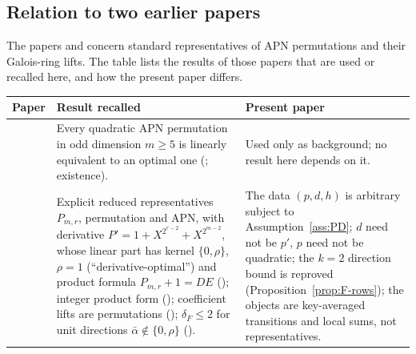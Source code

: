 \subsection{Relation to two earlier papers}
The papers \cite{FukuiIT} and \cite{FukuiFFA} concern standard representatives of APN permutations and their
Galois-ring lifts. The table lists the results of those papers that are used or recalled here, and how the present paper differs.
\begin{center}\small
\begin{tabular}{p{}p{}p{}}
\toprule
Paper & Result recalled & Present paper\\
\midrule
\cite{FukuiIT} & Every quadratic APN permutation in odd dimension $m\ge5$ is linearly equivalent to an optimal
one (\cite[Main Theorem]{FukuiIT}; existence). & Used only as background; no result here depends on it.\\
\cite{FukuiFFA} & Explicit reduced representatives $P_{m,r}$, permutation and APN, with derivative
$P'=1+X^{2^{r-2}}+X^{2^{m-2}}$, whose linear part has kernel $\{0,\rho\}$, $\rho=1$ (``derivative-optimal'')
and product formula $P_{m,r}+1=DE$ (\cite[Thm.~3.1, Def.~2.1]{FukuiFFA}); integer product form (\cite[Prop.~5.1]{FukuiFFA});
coefficient lifts are permutations (\cite[Prop.~6.1]{FukuiFFA}); $\delta_F\le 2$ for unit directions
$\bar\alpha\notin\{0,\rho\}$ (\cite[Thm.~6.2(1)]{FukuiFFA}). & The data $(p,d,h)$ is arbitrary subject to
Assumption~\ref{ass:PD}; $d$ need not be $p'$, $p$ need not be quadratic; the $k=2$ direction bound
is reproved (Proposition~\ref{prop:F-rows}); the objects are key-averaged transitions and local sums,
not representatives.\\
\bottomrule
\end{tabular}
\end{center}

